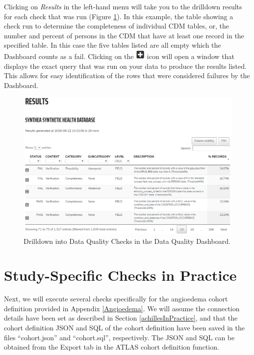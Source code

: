\documentclass[11pt]{book}
\theoremstyle{definition}
\theoremstyle{definition}
\theoremstyle{definition}
\theoremstyle{remark}
\begin{document}
Clicking on \emph{Results} in the left-hand menu will take you to the
drilldown results for each check that was run (Figure
\ref{fig:dqdResults}). In this example, the table showing a check run to
determine the completeness of individual CDM tables, or, the number and
percent of persons in the CDM that have at least one record in the
specified table. In this case the five tables listed are all empty which
the Dashboard counts as a fail. Clicking on the
\includegraphics{images/DataQuality/plusIcon.png} icon will open a
window that displays the exact query that was run on your data to
produce the results listed. This allows for easy identification of the
rows that were considered failures by the Dashboard.

\begin{figure}

{\centering \includegraphics[width=1\linewidth]{images/DataQuality/dqdResults} 

}

\caption{Drilldown into Data Quality Checks in the Data Quality Dashboard.}\label{fig:dqdResults}
\end{figure}

\section{Study-Specific Checks in
Practice}\label{study-specific-checks-in-practice}

Next, we will execute several checks specifically for the angioedema
cohort definition provided in Appendix \ref{Angioedema}. We will assume
the connection details have been set as described in Section
\ref{achillesInPractice}, and that the cohort definition JSON and SQL of
the cohort definition have been saved in the files ``cohort.json'' and
``cohort.sql'', respectively. The JSON and SQL can be obtained from the
Export tab in the ATLAS cohort definition function.
\end{document}
